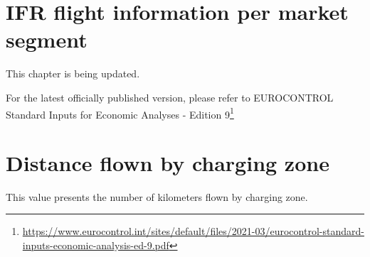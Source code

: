 \documentclass[
  11pt,
  a4paper,
]{book}
\DeclareRobustCommand{\href}[2]{#2\footnote{\url{#1}}}
\begin{document}
\hypertarget{sec-ifr-flight-information-per-market-segment}{%
\chapter{IFR flight information per market
segment}\label{sec-ifr-flight-information-per-market-segment}}

This chapter is being updated.

For the latest officially published version, please refer to
\href{https://www.eurocontrol.int/sites/default/files/2021-03/eurocontrol-standard-inputs-economic-analysis-ed-9.pdf}{EUROCONTROL
Standard Inputs for Economic Analyses - Edition 9}

\hypertarget{sec-distance-flown-by-charging-zone}{%
\chapter{Distance flown by charging
zone}\label{sec-distance-flown-by-charging-zone}}

This value presents the number of kilometers flown by charging zone.
\end{document}
